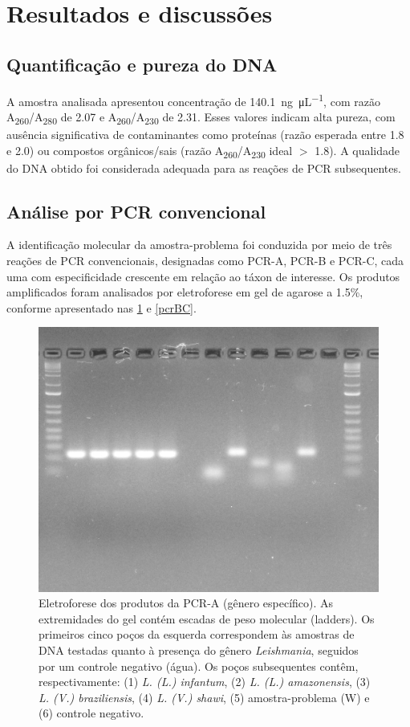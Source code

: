 \section{Resultados e discussões}
\subsection{Quantificação e pureza do DNA} 
A amostra analisada apresentou concentração de
\qty{140,1}{\nano\gram\per\micro\liter}, com razão
A\textsubscript{260}/A\textsubscript{280} de \num{2,07} e
A\textsubscript{260}/A\textsubscript{230} de \num{2,31}. Esses valores indicam
alta pureza, com ausência significativa de contaminantes como proteínas (razão
esperada entre \num{1.8} e \num{2.0}) ou compostos orgânicos/sais (razão
A\textsubscript{260}/A\textsubscript{230} ideal \(>\) \num{1.8})\cite{Alguém}. A
qualidade do DNA obtido foi considerada adequada para as reações de PCR
subsequentes.

\subsection{Análise por PCR convencional} A identificação molecular da
amostra-problema foi conduzida por meio de três reações de PCR convencionais,
designadas como PCR-A, PCR-B e PCR-C, cada uma com especificidade crescente em
relação ao táxon de interesse. Os produtos amplificados foram analisados por
eletroforese em gel de agarose a \num{1.5}\%, conforme apresentado nas
\cref{pcrA} e \cref{pcrBC}.

\begin{figure}
 \centering
 \includegraphics[width=.4\textwidth]{fig/pcrA_rflp_g8.jpg}
 \caption{Eletroforese dos produtos da PCR-A (gênero específico). As extremidades do gel contém escadas de peso molecular (ladders). 
 Os primeiros cinco poços da esquerda correspondem às amostras de DNA testadas quanto à presença do gênero \textit{Leishmania}, 
 seguidos por um controle negativo (água). Os poços subsequentes contêm, respectivamente: (1) \textit{L. (L.) infantum}, 
 (2) \textit{L. (L.) amazonensis}, (3) \textit{L. (V.) braziliensis}, (4) \textit{L. (V.) shawi}, (5) amostra-problema (W) e (6) controle negativo.}
 \label{pcrA}
 \end{figure}

